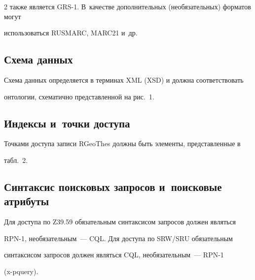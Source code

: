 \begin{multicols}{2}
также является GRS-1. В~качестве дополнительных (необязательных) форматов могут 

использоваться \mbox{RUSMARC}, {MARC}21 и~др.

  

  \subsection{Схема данных}

  

  Схема данных определяется в терминах {XML} (XSD) и должна соответствовать 

онтологии, схематично представленной на рис.~1.

  

  \subsection{Индексы и~точки доступа}

  

  Точками доступа записи \mbox{RGeoThes} должны быть элементы, представленные в 

табл.~2.

  

  \subsection{Синтаксис поисковых запросов и~поисковые атрибуты}

  

  Для доступа по Z39.59 обязательным синтаксисом запросов должен являться 

RPN-1, необязательным~--- {CQL}. Для доступа по \mbox{SRW/SRU} обязательным 

синтаксисом запросов должен являться {CQL}, необязательным~--- RPN-1 

  ({x-pquery}).

   

   \begin{table}\small

   \begin{center}


   \vspace*{2ex}

   

   \begin{tabular}{|l|c|c|c|}

   \hline


\end{tabular}
\end{center}
\end{table}
\end{multicols}
